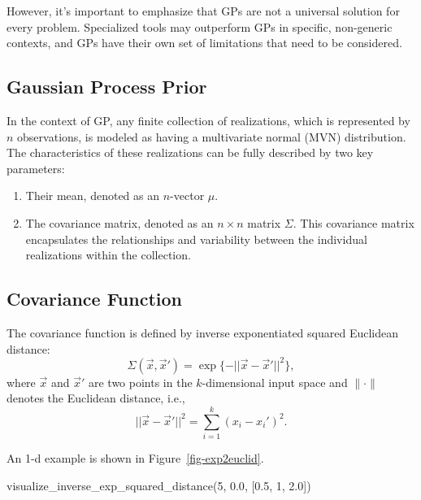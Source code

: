 \documentclass[
  letterpaper,
  DIV=11,
  numbers=noendperiod]{scrreprt}
\newenvironment{Shaded}{\begin{snugshade}}{\end{snugshade}}
\newcommand{\DecValTok}[1]{\textcolor[rgb]{0.68,0.00,0.00}{#1}}
\newcommand{\FloatTok}[1]{\textcolor[rgb]{0.68,0.00,0.00}{#1}}
\newcommand{\NormalTok}[1]{\textcolor[rgb]{0.00,0.23,0.31}{#1}}
\providecommand{\tightlist}{%
  \setlength{\itemsep}{0pt}\setlength{\parskip}{0pt}}\usepackage{longtable,booktabs,array}
\begin{document}
However, it's important to emphasize that GPs are not a universal
solution for every problem. Specialized tools may outperform GPs in
specific, non-generic contexts, and GPs have their own set of
limitations that need to be considered.

\hypertarget{gaussian-process-prior}{%
\subsection{Gaussian Process Prior}\label{gaussian-process-prior}}

In the context of GP, any finite collection of realizations, which is
represented by \(n\) observations, is modeled as having a multivariate
normal (MVN) distribution. The characteristics of these realizations can
be fully described by two key parameters:

\begin{enumerate}
\def\labelenumi{\arabic{enumi}.}
\tightlist
\item
  Their mean, denoted as an \(n\)-vector \(\mu\).
\item
  The covariance matrix, denoted as an \(n \times n\) matrix \(\Sigma\).
  This covariance matrix encapsulates the relationships and variability
  between the individual realizations within the collection.
\end{enumerate}

\hypertarget{covariance-function}{%
\subsection{Covariance Function}\label{covariance-function}}

The covariance function is defined by inverse exponentiated squared
Euclidean distance: \[
\Sigma(\vec{x}, \vec{x}') = \exp\{ - || \vec{x} - \vec{x}'||^2 \},
\] where \(\vec{x}\) and \(\vec{x}'\) are two points in the
\(k\)-dimensional input space and \(\| \cdot \|\) denotes the Euclidean
distance, i.e., \[
|| \vec{x} - \vec{x}'||^2 = \sum_{i=1}^k (x_i - x_i')^2.
\]

An 1-d example is shown in Figure~\ref{fig-exp2euclid}.

\begin{Shaded}
\begin{Highlighting}[]
\NormalTok{visualize\_inverse\_exp\_squared\_distance(}\DecValTok{5}\NormalTok{, }\FloatTok{0.0}\NormalTok{, [}\FloatTok{0.5}\NormalTok{, }\DecValTok{1}\NormalTok{, }\FloatTok{2.0}\NormalTok{])}
\end{Highlighting}
\end{Shaded}
\end{document}
